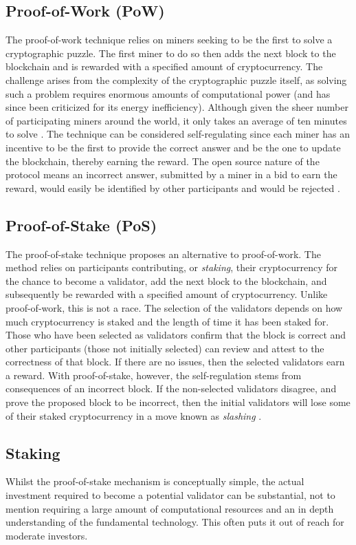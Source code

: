 \subsection{Proof-of-Work (PoW)}
The proof-of-work technique relies on miners seeking to be the first to solve a cryptographic puzzle. The first miner to do so then adds the next block to the blockchain and is rewarded with a specified amount of cryptocurrency. The challenge arises from the complexity of the cryptographic puzzle itself, as solving such a problem requires enormous amounts of computational power (and has since been criticized for its energy inefficiency). Although given the sheer number of participating miners around the world, it only takes an average of ten minutes to solve \citep{balan2021long}. The technique can be considered self-regulating since each miner has an incentive to be the first to provide the correct answer and be the one to update the blockchain, thereby earning the reward. The open source nature of the protocol means an incorrect answer, submitted by a miner in a bid to earn the reward, would easily be identified by other participants and would be rejected \citep{crypto_pow}. 

\subsection{Proof-of-Stake (PoS)}
The proof-of-stake technique proposes an alternative to proof-of-work. The method relies on participants contributing, or \textit{staking}, their cryptocurrency for the chance to become a validator, add the next block to the blockchain, and subsequently be rewarded with a specified amount of cryptocurrency. Unlike proof-of-work, this is not a race. The selection of the validators depends on how much cryptocurrency is staked and the length of time it has been staked for. Those who have been selected as validators confirm that the block is correct and other participants (those not initially selected) can review and attest to the correctness of that block. If there are no issues, then the selected validators earn a reward. With proof-of-stake, however, the self-regulation stems from consequences of an incorrect block. If the non-selected validators disagree, and prove the proposed block to be incorrect, then the initial validators will lose some of their staked cryptocurrency in a move known as \textit{slashing} \citep{crypto_pos}.

\subsection{Staking}
Whilst the proof-of-stake mechanism is conceptually simple, the actual investment required to become a potential validator can be substantial, not to mention requiring a large amount of computational resources and an in depth understanding of the fundamental technology. This often puts it out of reach for moderate investors. 

